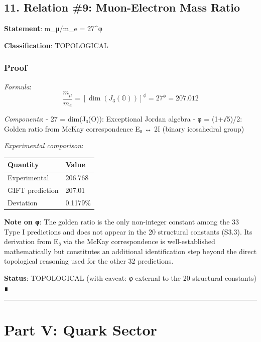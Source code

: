 \documentclass[11pt,a4paper]{article}
\begin{document}
\subsection{11. Relation \#9: Muon-Electron Mass Ratio}\label{relation-9-muon-electron-mass-ratio}

\textbf{Statement}: m\_μ/m\_e = 27\^{}φ

\textbf{Classification}: TOPOLOGICAL

\subsubsection{Proof}\label{proof-7}

\emph{Formula}:
\[\frac{m_\mu}{m_e} = [\dim(J_3(\mathbb{O}))]^\phi = 27^\phi = 207.012\]

\emph{Components}:
- 27 = dim(J₃(O)): Exceptional Jordan algebra
- φ = (1+√5)/2: Golden ratio from McKay correspondence E₈ ↔ 2I (binary icosahedral group)

\emph{Experimental comparison}:

{\def\LTcaptype{none} %
\begin{longtable}[]{@{}ll@{}}
\toprule\noalign{}
Quantity & Value \\
\midrule\noalign{}
\endhead
\bottomrule\noalign{}
\endlastfoot
Experimental & 206.768 \\
GIFT prediction & 207.01 \\
Deviation & 0.1179\% \\
\end{longtable}
}

\textbf{Note on φ}: The golden ratio is the only non-integer constant among the 33 Type I predictions and does not appear in the 20 structural constants (S3.3). Its derivation from E₈ via the McKay correspondence is well-established mathematically but constitutes an additional identification step beyond the direct topological reasoning used for the other 32 predictions.

\textbf{Status}: TOPOLOGICAL (with caveat: φ external to the 20 structural constants) ∎

\begin{center}\rule{0.5\linewidth}{0.5pt}\end{center}

\section{Part V: Quark Sector}\label{part-v-quark-sector}
\end{document}
